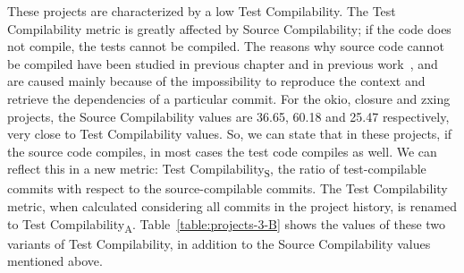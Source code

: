 These projects are characterized by a low Test Compilability. 
The Test Compilability metric is greatly affected by Source Compilability; if the code does not compile, the tests cannot be compiled. 
The reasons why source code cannot be compiled have been studied in previous chapter and in previous work~\cite{tufano2017there,Sulir:2016:QSJ:3001878.3001882}, and are caused mainly because of the impossibility to reproduce the context and retrieve the dependencies of a particular commit. 
For the okio, closure and zxing projects, the Source Compilability values are 36.65, 60.18 and 25.47 respectively, very close to Test Compilability values.
So, we can state that in these projects, if the source code compiles, in most cases the test code compiles as well. 
We can reflect this in a new metric: Test Compilability\textsubscript{S}, the ratio of test-compilable commits with respect to the source-compilable commits.
The Test Compilability metric, when calculated considering all commits in the project history, is renamed to Test Compilability\textsubscript{A}.
Table~\ref{table:projects-3-B} shows the values of these two variants of Test Compilability, in addition to the Source Compilability values mentioned above.


